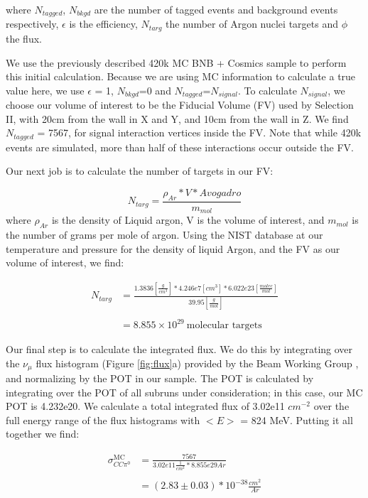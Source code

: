 \documentclass{article}
\begin{document}
\noindent where $N_{tagged}$, $N_{bkgd}$ are the number of tagged events and background events respectively, $\epsilon$ is the efficiency, $N_{targ}$ the number of Argon nuclei targets and $\phi$ the flux. 
\par We use the previously described 420k MC BNB + Cosmics sample to perform this initial calculation.  Because we are using MC information to calculate a true value here, we use $\epsilon$ = 1, $N_{bkgd}$=0 and $N_{tagged}$=$N_{signal}$.  To calculate $N_{signal}$, we choose our volume of interest to be the Fiducial Volume (FV) used by Selection II, with 20cm from the wall in X and Y, and 10cm from the wall in Z. We find $N_{tagged}$ = 7567, for signal interaction vertices inside the FV. Note that while 420k events are simulated, more than half of these interactions occur outside the FV. 
\par Our next job is to calculate the number of targets in our FV:

\begin{equation} \label{eq:1}
  N_{targ} = \frac{\rho_{Ar} * V * Avogadro}{m_{mol}} 
\end{equation}
\noindent where $\rho_{Ar}$ is the density of Liquid argon, V is the volume of interest, and $m_{mol}$ is the number of grams per mole of argon.  Using the NIST database at our temperature and pressure for the density of liquid Argon, and the FV as our volume of interest, we find: 

\begin{align}
N_{targ} &= \frac{1.3836 [\frac{g}{cm^3}] * 4.246e7 [cm^3] * 6.022e23 [\frac{molec}{mol}]}{39.95 [\frac{g}{mol}]} \\\\
&= 8.855\times10^{29}~\text{molecular targets}
\end{align}

\par Our final step is to calculate the integrated flux.  We do this by integrating over the $\nu_\mu$ flux histogram (Figure \ref{fig:flux}a) provided by the Beam Working Group \cite{bib:flux}, and normalizing by the POT in our sample. The POT is calculated by integrating over the POT of all subruns under consideration; in this case, our MC POT is 4.232e20.  We calculate a total integrated flux of 3.02e11 $cm^{-2}$ over the full energy range of the flux histograms with $<E>$ = 824 MeV. 
\noindent Putting it all together we find:


\begin{align}
\sigma^{\text{MC}}_{CC\pi^0} &= \frac{7567}{3.02e11 \frac{1}{cm^2} * 8.855e29 Ar } \\\\
&= (2.83 \pm 0.03) *10^{-38} \frac{cm^2}{Ar}
\end{align}
\end{document}

